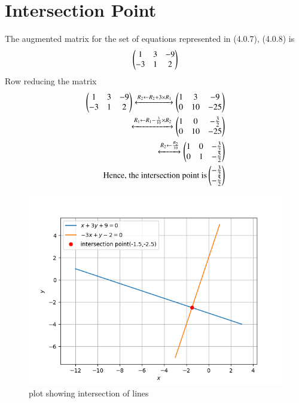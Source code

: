 \documentclass[journal,12pt,twocolumn]{IEEEtran}
\begin{document}
\section{Intersection Point}
The augmented matrix for the set of equations represented in (4.0.7), (4.0.8) is
\begin{align}
\begin{pmatrix}1&3&-9\\-3&1&2\end{pmatrix}
\end{align}
Row reducing the matrix
\begin{align}
 \begin{pmatrix}1&3&-9\\-3&1&2\end{pmatrix}\xleftrightarrow[]{R_2\leftarrow R_2+3\times R_1}\begin{pmatrix}1&3&-9\\0&10&-25\end{pmatrix}\\
 \xleftrightarrow[]{R_1\leftarrow R_1-\frac{3}{10}\times R_2}\begin{pmatrix}1&0&-\frac{3}{2}\\0&10&-25\end{pmatrix}\\
 \xleftrightarrow[]{R_2\leftarrow \frac{R_2}{10}}\begin{pmatrix}1&0&-\frac{3}{2}\\0&1&-\frac{5}{2}\end{pmatrix}\\
\text{Hence, the intersection point is}
\begin{pmatrix}-\frac{3}{2}\\-\frac{5}{2}\end{pmatrix}
\end{align}
\begin{figure}[!ht]
\centering
\includegraphics[width=\columnwidth]{hw4plot.png}
\caption{plot showing intersection of lines}
\label{Fig}
\end{figure}
\end{document}
